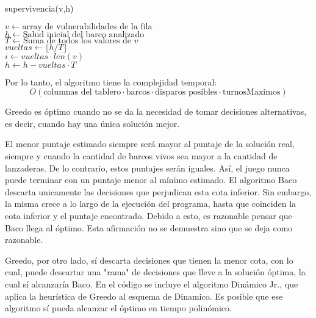 \documentclass{article}
\begin{document}
\begin{algorithm}
\caption{supervivencia(v,h)}
    $v \leftarrow \text{array de vulnerabilidades de la fila}$ \\
    $h \leftarrow \text{Salud inicial del barco analizado}$ \\
    
    
    $T \leftarrow \text{Suma de todos los valores de } v$ \\
    $vueltas \leftarrow \lfloor h / T \rfloor $ \\
    $i \leftarrow vueltas \cdot len(v)$ \\
    $h \leftarrow h-vueltas \cdot T$ \\
    
    
    
\end{algorithm}

Por lo tanto, el algoritmo tiene la complejidad temporal:
$$O(\text{columnas del tablero} \cdot \text{barcos}  \cdot \text{disparos posibles} \cdot \text{turnosMaximos})$$


Greedo es óptimo cuando no se da la necesidad de tomar decisiones alternativas, es decir, cuando hay una única solución mejor. 

El menor puntaje estimado siempre será mayor al puntaje de la solución real, siempre y cuando la cantidad de barcos vivos sea mayor a la cantidad de lanzaderas. De lo contrario, estos puntajes serán iguales. Así, el juego nunca puede terminar con un puntaje menor al mínimo estimado. El algoritmo Baco descarta unicamente las decisiones que perjudican esta cota inferior. Sin embargo, la misma crece a lo largo de la ejecución del programa, hasta que coinciden la cota inferior y el puntaje encontrado. Debido a esto, es razonable pensar que Baco llega al óptimo. Esta afirmación no se demuestra sino que se deja como razonable.

Greedo, por otro lado, sí descarta decisiones que tienen la menor cota, con lo cual, puede descartar una "rama" de decisiones que lleve a la solución óptima, la cual sí alcanzaría Baco. En el código se incluye el algoritmo Dinámico Jr., que aplica la heurística de Greedo al esquema de Dinamico. Es posible que ese algoritmo sí pueda alcanzar el óptimo en tiempo polinómico.
\end{document}

